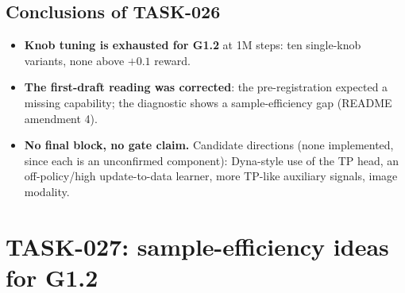 \documentclass[10pt,a4paper]{article}
\begin{document}
\subsection{Conclusions of TASK-026}
\begin{itemize}\itemsep1pt
\item \textbf{Knob tuning is exhausted for G1.2} at 1M steps: ten single-knob variants, none above $+0.1$ reward.
\item \textbf{The first-draft reading was corrected}: the pre-registration expected a missing capability; the diagnostic shows a sample-efficiency gap (README amendment 4).
\item \textbf{No final block, no gate claim.} Candidate directions (none implemented, since each is an unconfirmed component): Dyna-style use of the TP head, an off-policy/high update-to-data learner, more TP-like auxiliary signals, image modality.
\end{itemize}

\section{TASK-027: sample-efficiency ideas for G1.2}\label{sec:t027}
\end{document}
